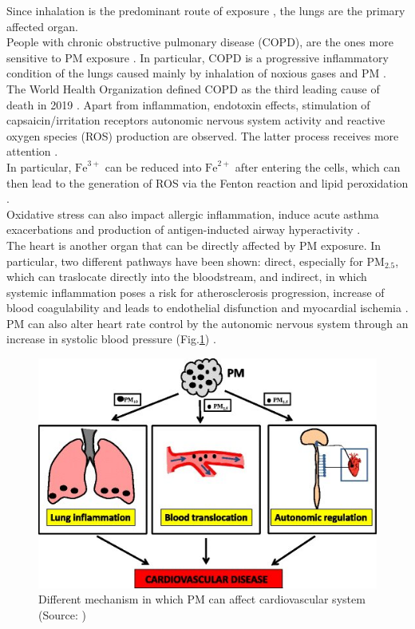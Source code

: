 Since inhalation is the predominant route of exposure \cite{broday2001growth}, the lungs are the primary affected organ.\\
People with chronic obstructive pulmonary disease (COPD), are the ones more sensitive to PM exposure \cite{sint2008ambient}. In particular, COPD is a progressive inflammatory condition of the lungs caused mainly by inhalation of noxious gases and PM \cite{ling2009particulate}.\\
The World Health Organization defined COPD as the third leading cause of death in 2019 \cite{whoChronicObstructive}.
Apart from inflammation, endotoxin effects, stimulation of capsaicin/irritation receptors autonomic nervous system activity and reactive oxygen species (ROS) production are observed. The latter process receives more attention \cite{li2008role}.\\
In particular, $\text{Fe}^{3+}$ can be reduced into $\text{Fe}^{2+}$ after entering the cells, which can then lead to the generation of ROS via the Fenton reaction and lipid peroxidation \cite{cory2019impact}. \\
Oxidative stress can also impact allergic inflammation, induce acute asthma exacerbations and production of antigen-inducted airway hyperactivity \cite{li2003particulate}.\\

The heart is another organ that can be directly affected by PM exposure. In particular, two different pathways have been shown: direct, especially for $\text{PM}_{2.5}$, which can traslocate directly into the bloodstream, and indirect, in which systemic inflammation poses a risk for atherosclerosis progression, increase of blood coagulability and leads to endothelial disfunction and myocardial ischemia \cite{du2016air}.
PM can also alter heart rate control by the autonomic nervous system through an increase in systolic blood pressure (Fig.\ref{fig:Heart}) \cite{fiordelisi2017mechanisms}. 

\begin{figure}[H]
\centering
    \includegraphics[scale=0.4]{images/Heart.jpg}
    \caption{Different mechanism in which PM can affect cardiovascular system (Source: \cite{fiordelisi2017mechanisms})
}
    \label{fig:Heart}
\end{figure}

